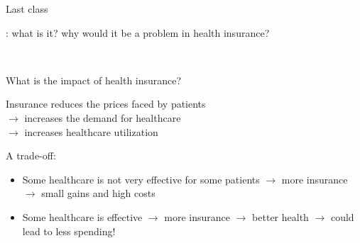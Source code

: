 \begin{frame}{Last class}

    : what is it? why would it be a problem in health insurance?\\
    \vspace{3mm}

    \\

\end{frame}
\begin{frame}{What is the impact of health insurance?}

    Insurance reduces the prices faced by patients\\
    $\rightarrow$ increases the demand for healthcare\\
    $\rightarrow$ increases healthcare utilization\\
    \vspace{5mm}

    A trade-off:
    \begin{itemize}
        \item Some healthcare is not very effective for some patients $\rightarrow$ more insurance $\rightarrow$ small gains and high costs
        \item Some healthcare is effective $\rightarrow$ more insurance $\rightarrow$ better health $\rightarrow$ could lead to less spending!
    \end{itemize}

\end{frame}
